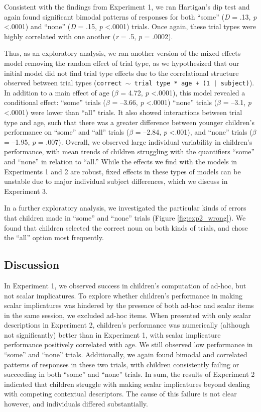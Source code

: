 \documentclass[man]{apa2}
\begin{document}
Consistent with the findings from Experiment 1, we ran Hartigan's dip test and again found significant bimodal patterns of responses for both ``some'' (\textit{D} = .13, \textit{p} \textless  .0001) and ``none'' (\textit{D} = .15, \textit{p} \textless  .0001) trials. Once again, these trial types were highly correlated with one another (\textit{r} = .5, \textit{p} = .0002).

Thus, as an exploratory analysis, we ran another version of the mixed effects model removing the random effect of trial type, as we hypothesized that our initial model did not find trial type effects due to the correlational structure observed between trial types ({\tt{correct $\sim$ trial type * age + (1 | subject)}}). In addition to a main effect of age ($\beta$ = 4.72, \textit{p} \textless .0001), this model revealed a conditional effect: ``some'' trials ($\beta$ = --3.66, \emph{p} \textless .0001) ``none'' trials ($\beta$ = --3.1, \emph{p} \textless .0001) were lower than ``all'' trials. It also showed interactions between trial type and age, such that there was a greater difference between younger children's performance on ``some'' and ``all'' trials ($\beta$ = --2.84, \textit{p} \textless  .001), and ``none'' trials ($\beta$ = --1.95, \textit{p} = .007). Overall, we observed large individual variability in children's performance, with mean trends of children struggling with the quantifiers ``some'' and ``none'' in relation to ``all.'' While the effects we find with the models in Experiments 1 and 2 are robust, fixed effects in these types of models can be unstable due to major individual subject differences, which we discuss in Experiment 3.

In a further exploratory analysis, we investigated the particular kinds of errors that children made in ``some'' and ``none'' trials (Figure \ref{fig:exp2_wrong}). We found that children selected the correct noun on both kinds of trials, and chose the ``all'' option most frequently.

\subsection{Discussion}

In Experiment 1, we observed success in children's computation of ad-hoc, but not scalar implicatures. To explore whether children's performance in making scalar implicatures was hindered by the presence of both ad-hoc and scalar items in the same session, we excluded ad-hoc items. When presented with only scalar descriptions in Experiment 2, children's performance was numerically (although not significantly) better than in Experiment 1, with scalar implicature performance positively correlated with age. We still observed low performance in ``some'' and ``none'' trials. Additionally, we again found bimodal and correlated patterns of responses in these two trials, with children consistently failing or succeeding in both ``some'' and ``none'' trials. In sum, the results of Experiment 2 indicated that children struggle with making scalar implicatures beyond dealing with competing contextual descriptors. The cause of this failure is not clear however, and individuals differed substantially.
\end{document}
